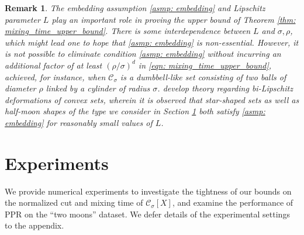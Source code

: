 \documentclass[11pt,twoside]{article}
\newtheorem*{remark}{Remark}
\newcommand{\1}{\mathbf{1}}
\newcommand{\Xbf}{X}             %
\newcommand{\Cset}{\mathcal{C}}
\newcommand{\Csig}{\Cset_{\sigma}}
\begin{document}
\begin{remark}
  The embedding assumption \ref{asmp: embedding} and Lipschitz parameter $L$
  play an important role in proving the upper bound of Theorem \ref{thm:
    mixing_time_upper_bound}. There is some interdependence between $L$ and
  $\sigma,\rho$, which might lead one to hope that \ref{asmp: embedding} is
  non-essential. However, it is not possible to eliminate condition \ref{asmp:
    embedding} without incurring an additional factor of at least
  $(\rho/\sigma)^d$ in \eqref{eqn: mixing_time_upper_bound}, achieved, for
  instance, when $\Csig$ is a dumbbell-like set consisting of two balls of
  diameter $\rho$ linked by a cylinder of radius
  $\sigma$. \citet{abbasi-yadkori2016, abbasi-yadkori2016a}  
  develop theory regarding bi-Lipschitz deformations of convex sets, wherein it
  is observed that star-shaped sets as well as half-moon shapes of the type we
  consider in Section \ref{sec: experiments} both satisfy \ref{asmp: embedding}
  for reasonably small values of $L$. 
\end{remark}

\section{Experiments}
\label{sec: experiments}

We provide numerical experiments to investigate the tightness of our bounds on
the normalized cut and mixing time of $\Csig[\Xbf]$, and examine the performance
of PPR on the ``two moons'' dataset. We defer details of the experimental
settings to the appendix.   
\end{document}
